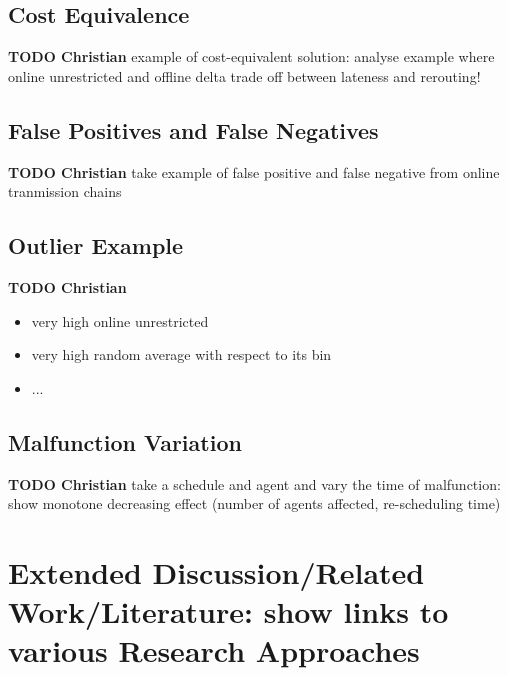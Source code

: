 \documentclass{article}
\begin{document}
\subsection{Cost Equivalence}\label{subsec:cost_equivalence}
\begin{mdframed}
{\bf TODO Christian} example of cost-equivalent solution: analyse example where online unrestricted and offline delta trade off between lateness and rerouting!
\end{mdframed}


\subsection{False Positives and False Negatives}
\label{subsec:false_positives_false_negatives}
\begin{mdframed}
{\bf TODO Christian} take example of false positive and false negative from online tranmission chains
\end{mdframed}


\subsection{Outlier Example}\label{subsec:outlier}
\begin{mdframed}
{\bf TODO Christian}
\begin{itemize}
    \item very high online unrestricted
    \item very high random average with respect to its bin
    \item ...
\end{itemize}
\end{mdframed}


\subsection{Malfunction Variation}\label{subsec:malfunction_variation}

\begin{mdframed}
{\bf TODO Christian} take a schedule and agent and vary the time of malfunction: show monotone decreasing effect (number of agents affected, re-scheduling time)
\end{mdframed}




\section{Extended Discussion/Related Work/Literature: show links to various Research Approaches}
\end{document}
